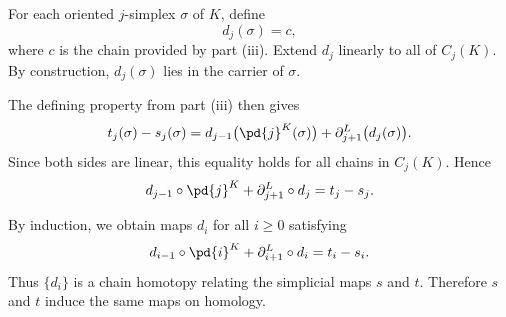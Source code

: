 \begin{solution}[(iv)]
  For each oriented $j$-simplex $\sigma$ of $K$, define
  \[%
    d_j(\sigma) = c
  ,\]%
  where $c$ is the chain provided by part (iii). Extend $d_j$ linearly to all of $C_j(K)$. By construction, $d_j(\sigma)$ lies in the carrier of $\sigma$.

  The defining property from part (iii) then gives
  \[%
    t_j(\sigma) - s_j(\sigma) = d_{j-1}\big(\pd{j}^K(\sigma)\big) + \partial_{j+1}^L\big(d_j(\sigma)\big)
  .\]%
  Since both sides are linear, this equality holds for all chains in $C_j(K)$. Hence
  \[%
    d_{j-1} \circ \pd{j}^K + \partial_{j+1}^L \circ d_j = t_j - s_j
  .\]%

  By induction, we obtain maps $d_i$ for all $i \ge 0$ satisfying
  \[%
    d_{i-1} \circ \pd{i}^K + \partial_{i+1}^L \circ d_i = t_i - s_i
  .\]%
  Thus $\{d_i\}$ is a chain homotopy relating the simplicial maps $s$ and $t$. Therefore $s$ and $t$ induce the same maps on homology.
\end{solution}
